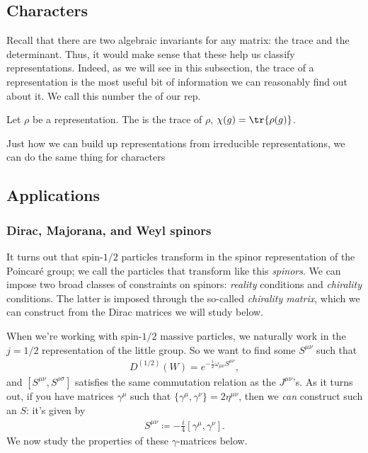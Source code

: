\documentclass[11pt]{article}
\begin{document}
\subsection{Characters}

Recall that there are two algebraic invariants for any matrix:
the trace and the determinant. Thus, it would make sense that
these help us classify representations. Indeed, as we will see
in this subsection, the trace of a representation is the most useful
bit of information we can reasonably find out about it. We call this
number the  of our rep.

\begin{definition}
    Let $\rho$ be a representation. The  is the trace of
    $\rho$, $\chi(g) = \tr{\rho(g)}$.
\end{definition}

Just how we can build up representations from irreducible representations,
we can do the same thing for characters


\subsection{Applications}

\subsubsection{Dirac, Majorana, and Weyl spinors}

\begin{reemark}
    It turns out that spin-$1/2$ particles transform in the spinor
    representation of the Poincaré group; we call the particles
    that transform like this \emph{spinors}. We can impose two
    broad classes of constraints on spinors: \emph{reality} conditions
    and \emph{chirality} conditions. The latter is imposed through the
    so-called \emph{chirality matrix}, which we can construct from
    the Dirac matrices we will study below.
\end{reemark}

\begin{eexample}
    When we're working with spin-$1/2$ massive particles, we naturally work
    in the $j = 1/2$ representation of the little group. So we want to find
    some $S^{\mu \nu}$ such that
    \begin{align*}
        D^{(1/2)}(W) = e^{- \frac{i}{2} \omega_{\mu \nu} S^{\mu \nu}},
    \end{align*} 
    and $[S^{\mu \nu}, S^{\rho \sigma}]$ satisfies the same commutation relation
    as the $J^{\mu \nu}$'s. As it turns out, if you have matrices $\gamma^\mu$
    such that $\{ \gamma^\mu, \gamma^\nu \} = 2 \eta^{\mu \nu}$, then we
    \emph{can} construct such an $S$: it's given by
    \begin{align*}
        \boxed{S^{\mu \nu} \coloneqq - \frac{i}{4} [\gamma^\mu, \gamma^\nu].}
    \end{align*}
    We now study the properties of these $\gamma$-matrices below.
\end{eexample}
\end{document}
